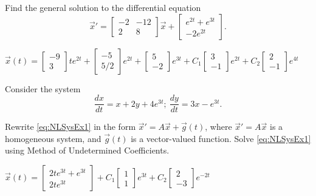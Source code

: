 \begin{exercise}
Find the general solution to the differential equation
\begin{equation*}
{\vec{x}}' = \begin{bmatrix} -2 & -12 \\ 2 & 8 \end{bmatrix} \vec{x} + \begin{bmatrix} e^{2t} + e^{3t} \\ -2e^{2t} \end{bmatrix}. 
\end{equation*}
\end{exercise}
\comboSol{%
}
{%
$\vec{x}(t) = \left[\begin{smallmatrix} -9 \\ 3 \end{smallmatrix}\right]te^{2t} + \left[\begin{smallmatrix} -5 \\ 5/2 \end{smallmatrix}\right]e^{2t} + \left[\begin{smallmatrix} 5 \\ -2 \end{smallmatrix}\right]e^{3t} + C_1\left[\begin{smallmatrix} 3 \\ -1 \end{smallmatrix}\right]e^{2t} + C_2\left[\begin{smallmatrix} 2 \\ -1 \end{smallmatrix}\right]e^{4t}$
}

\begin{exercise}
Consider the system %
\begin{equation}
\frac{dx}{dt}= x+2y+4e^{3t};\ \frac{dy}{dt}=3x-e^{3t}. \label{eq:NLSysEx1}
\end{equation}

\begin{tasks}
\task Rewrite \eqref{eq:NLSysEx1} in the form $\vec{x}'=A\vec{x}+\vec{g}(t)$, where $\vec{x}'=A\vec{x}$ is a homogeneous system, and $\vec{g}(t)$ is a vector-valued function.
\task Solve \eqref{eq:NLSysEx1} using Method of Undetermined Coefficients.
\end{tasks}
\end{exercise}
\comboSol{%
}
{%
$\vec{x}(t) = \left[\begin{smallmatrix} 2te^{3t} + e^{3t} \\ 2te^{3t} \end{smallmatrix}\right] + C_1\left[\begin{smallmatrix} 1 \\ 1 \end{smallmatrix}\right]e^{3t} + C_2\left[\begin{smallmatrix} 2 \\ -3 \end{smallmatrix}\right]e^{-2t}$
}

